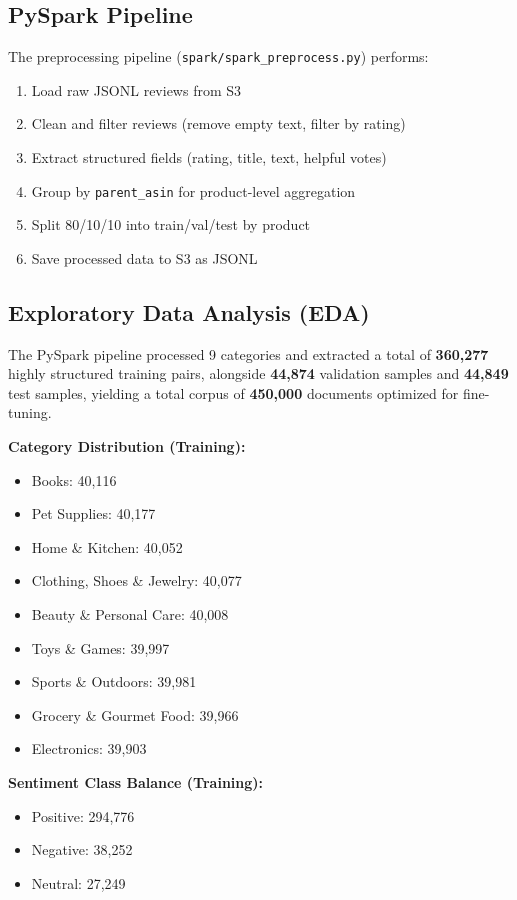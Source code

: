 \documentclass[12pt,a4paper]{article}
\begin{document}
\subsection{PySpark Pipeline}

The preprocessing pipeline (\texttt{spark/spark\_preprocess.py}) performs:

\begin{enumerate}
    \item Load raw JSONL reviews from S3
    \item Clean and filter reviews (remove empty text, filter by rating)
    \item Extract structured fields (rating, title, text, helpful votes)
    \item Group by \texttt{parent\_asin} for product-level aggregation
    \item Split 80/10/10 into train/val/test by product
    \item Save processed data to S3 as JSONL
\end{enumerate}

\subsection{Exploratory Data Analysis (EDA)}

The PySpark pipeline processed 9 categories and extracted a total of \textbf{360,277} highly structured training pairs, alongside \textbf{44,874} validation samples and \textbf{44,849} test samples, yielding a total corpus of \textbf{450,000} documents optimized for fine-tuning.

\textbf{Category Distribution (Training):}
\begin{itemize}
    \item Books: 40,116
    \item Pet Supplies: 40,177
    \item Home \& Kitchen: 40,052
    \item Clothing, Shoes \& Jewelry: 40,077
    \item Beauty \& Personal Care: 40,008
    \item Toys \& Games: 39,997
    \item Sports \& Outdoors: 39,981
    \item Grocery \& Gourmet Food: 39,966
    \item Electronics: 39,903
\end{itemize}

\textbf{Sentiment Class Balance (Training):}
\begin{itemize}
    \item Positive: 294,776
    \item Negative: 38,252
    \item Neutral: 27,249
\end{itemize}
\end{document}
